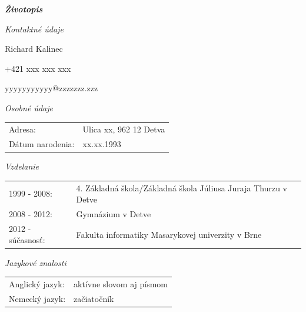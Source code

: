\documentclass{article}
\begin{document}
\begin{center}
\Huge
\textbf{\textit{Životopis}}
\end{center}
\bigskip

\begin{flushleft}
\Large
\textit{\textsf{Kontaktné údaje}}
\normalsize

\smallskip

Richard Kalinec

+421 xxx xxx xxx

yyyyyyyyyyy@zzzzzzz.zzz
\end{flushleft}

\bigskip

\begin{flushleft}
\Large
\textit{\textsf{Osobné údaje}}
\normalsize
\end{flushleft}

\smallskip

\begin{adjustwidth}{-6pt}{}
\begin{tabular}{l l}
	Adresa: & Ulica xx, 962 12 Detva \\
	Dátum narodenia: & xx.xx.1993
\end{tabular}
\end{adjustwidth}

\bigskip

\begin{flushleft}
\Large
\textit{\textsf{Vzdelanie}}
\normalsize
\end{flushleft}

\smallskip

\begin{adjustwidth}{-6pt}{}
\begin{tabular}{l l}
	1999 - 2008: & 4. Základná škola/Základná škola Júliusa Juraja Thurzu v Detve\\
	2008 - 2012: & Gymnázium v Detve\\
	2012 - súčasnosť: & Fakulta informatiky Masarykovej univerzity v Brne\\
\end{tabular}
\end{adjustwidth}

\bigskip

\begin{flushleft}
\Large
\textit{\textsf{Jazykové znalosti}}
\normalsize
\end{flushleft}

\smallskip

\begin{adjustwidth}{-6pt}{}
\begin{tabular}{l l}
Anglický jazyk: & aktívne slovom aj písmom \\
Nemecký jazyk: & začiatočník
\end{tabular}
\end{adjustwidth}
\end{document}

